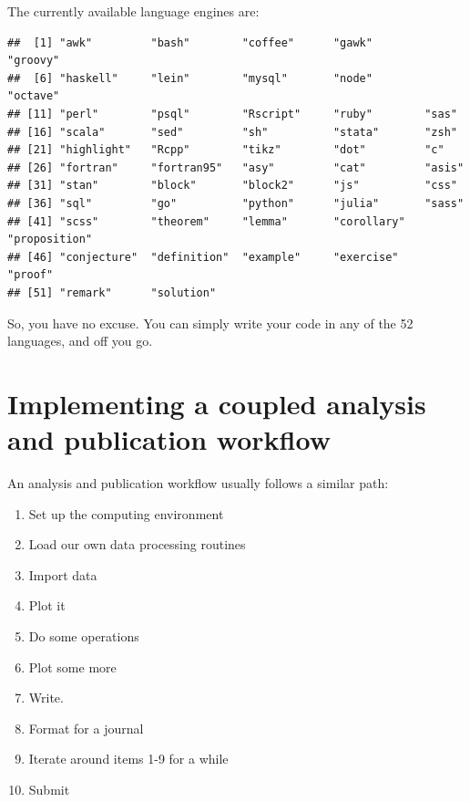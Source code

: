 \documentclass[10pt,]{article}
\newenvironment{Shaded}{\begin{snugshade}}{\end{snugshade}}
\newcommand{\KeywordTok}[1]{\textcolor[rgb]{0.13,0.29,0.53}{\textbf{#1}}}
\newcommand{\NormalTok}[1]{#1}
\newcommand{\OperatorTok}[1]{\textcolor[rgb]{0.81,0.36,0.00}{\textbf{#1}}}
\providecommand{\tightlist}{%
  \setlength{\itemsep}{0pt}\setlength{\parskip}{0pt}}
\begin{document}
The currently available language engines are:

\begin{Shaded}
\end{Shaded}

\begin{verbatim}
##  [1] "awk"         "bash"        "coffee"      "gawk"        "groovy"     
##  [6] "haskell"     "lein"        "mysql"       "node"        "octave"     
## [11] "perl"        "psql"        "Rscript"     "ruby"        "sas"        
## [16] "scala"       "sed"         "sh"          "stata"       "zsh"        
## [21] "highlight"   "Rcpp"        "tikz"        "dot"         "c"          
## [26] "fortran"     "fortran95"   "asy"         "cat"         "asis"       
## [31] "stan"        "block"       "block2"      "js"          "css"        
## [36] "sql"         "go"          "python"      "julia"       "sass"       
## [41] "scss"        "theorem"     "lemma"       "corollary"   "proposition"
## [46] "conjecture"  "definition"  "example"     "exercise"    "proof"      
## [51] "remark"      "solution"
\end{verbatim}

So, you have no excuse. You can simply write your code in any of the 52 languages, and off you go.

\hypertarget{implementing-a-coupled-analysis-and-publication-workflow}{%
\section{Implementing a coupled analysis and publication workflow}\label{implementing-a-coupled-analysis-and-publication-workflow}}

An analysis and publication workflow usually follows a similar path:

\begin{enumerate}
\def\labelenumi{\arabic{enumi}.}
\tightlist
\item
  Set up the computing environment
\item
  Load our own data processing routines
\item
  Import data
\item
  Plot it
\item
  Do some operations
\item
  Plot some more
\item
  Write.
\item
  Format for a journal
\item
  Iterate around items 1-9 for a while
\item
  Submit
\end{enumerate}
\end{document}
